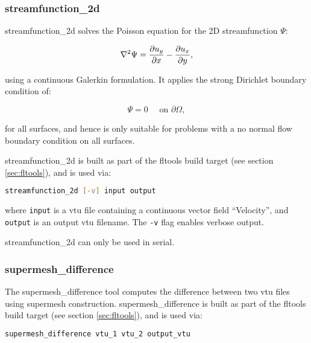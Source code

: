 
\subsubsection{streamfunction\_2d}
\label{sec:streamfunction_2d}

streamfunction\_2d solves the Poisson equation for the 2D streamfunction $\Psi$:

\begin{equation}
\nabla^2 \Psi = \ppx{u_y} - \ppx[y]{u_x},
\end{equation}

using a continuous Galerkin formulation. It applies the strong Dirichlet
boundary condition of:

\begin{equation}
\Psi = 0 \quad \text{ on } \partial \Omega,
\end{equation}

for all surfaces, and hence is only suitable for problems with a no normal flow boundary
condition on all surfaces.

streamfunction\_2d is built as part of the fltools build target (see section \ref{sec:fltools}),
and is used via:

\begin{lstlisting}[language = Bash]
streamfunction_2d [-v] input output
\end{lstlisting}

where \lstinline[language = Bash]+input+ is a vtu file containing a continuous vector
field ``Velocity'', and \lstinline[language = Bash]+output+ is an output vtu filename. The
\lstinline[language = Bash]+-v+ flag enables verbose output.

streamfunction\_2d can only be used in serial.


\subsubsection{supermesh\_difference}
\label{sec:supermesh_difference}

The supermesh\_difference tool computes the difference between two vtu
files using supermesh construction. supermesh\_difference is built as part of
the fltools build target (see section \ref{sec:fltools}), and is used via:

\begin{lstlisting}[language = Bash]
supermesh_difference vtu_1 vtu_2 output_vtu
\end{lstlisting}

